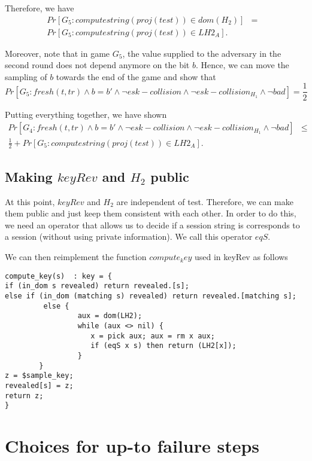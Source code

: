 \documentclass[]{article}
\begin{document}
Therefore, we have
\begin{align*}
 Pr[G_5 : computestring(proj(test)) \in dom(H_2) ]  &=& \\
 Pr[G_5 : computestring(proj(test)) \in LH2_A ].
\end{align*}

Moreover, note that in game $G_5$, the value supplied to the adversary in the second round does not depend anymore on the bit $b$. Hence, we can move the sampling of $b$ towards the end of the game and show that 
\[
  Pr[G_5 : fresh(t,tr) \land b = b' \land \neg esk-collision \land \neg esk-collision_{H_1} \land \neg bad] =
  \frac{1}{2}
\]

Putting everything together, we have shown 
\begin{align*}
  Pr[G_4 : fresh(t,tr) \land b = b' \land \neg esk-collision \land \neg esk-collision_{H_1} \land \neg bad]  &\leq&\\ 
\frac{1}{2} +  Pr[G_5 : computestring(proj(test)) \in LH2_A ].
\end{align*}

\subsection{Making $keyRev$ and $H_2$ public}
At this point, $keyRev$ and $H_2$ are independent of test. Therefore, we can make them public and just keep them consistent with each other. In order to do this, we need an operator that allows us to decide if a session string is corresponds to a session (without using private information). We call this operator $eqS$.

We can then reimplement the function $compute_key$ used in keyRev as follows

\begin{verbatim}
compute_key(s)  : key = {
if (in_dom s revealed) return revealed.[s];
else if (in_dom (matching s) revealed) return revealed.[matching s]; 
         else {
                 aux = dom(LH2);	
                 while (aux <> nil) {
                    x = pick aux; aux = rm x aux;
                    if (eqS x s) then return (LH2[x]);
                 }
        }
z = $sample_key;
revealed[s] = z;
return z; 	
} 

\end{verbatim}



\section{Choices for up-to failure steps}
\end{document}
